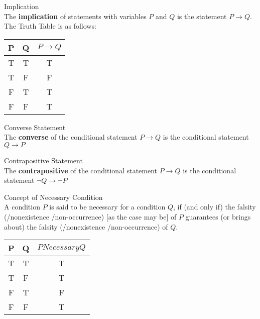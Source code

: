 \begin{definition}
Implication \\

The {\bf implication} of statements with variables $P$ and $Q$ is the statement $P \to Q$. The Truth Table is as follows: \\
\begin{center}
\begin{tabular}{|c|c|c|}
\hline 
P & Q & $P \to Q$ \\ 
\hline 
T & T & T \\ 
\hline 
T & F & F \\ 
\hline 
F & T & T \\ 
\hline 
F & F & T \\ 
\hline 
\end{tabular} 
\end{center}
\end{definition}

\begin{definition}
Converse Statement \\

The {\bf converse} of the conditional statement $P \to Q$ is the conditional statement $Q \to P$
\end{definition}

\begin{definition}
Contrapositive Statement \\

The {\bf contrapositive} of the conditional statement $P \to Q$ is the conditional statement $\neg Q \to \neg P$
\end{definition}


\begin{definition}
Concept of Necessary Condition \\
A condition $P$ is said to be necessary for a condition $Q$, if (and only if) the falsity (/nonexistence /non-occurrence) [as the case may be] of $P$ guarantees (or brings about) the falsity (/nonexistence /non-occurrence) of $Q$. \\

\begin{center}
\begin{tabular}{|c|c|c|}
\hline 
P & Q & $P Necessary Q$ \\ 
\hline 
T & T & T \\ 
\hline 
T & F & T \\ 
\hline 
F & T & F \\ 
\hline 
F & F & T \\ 
\hline 
\end{tabular} 
\end{center}

\end{definition}

